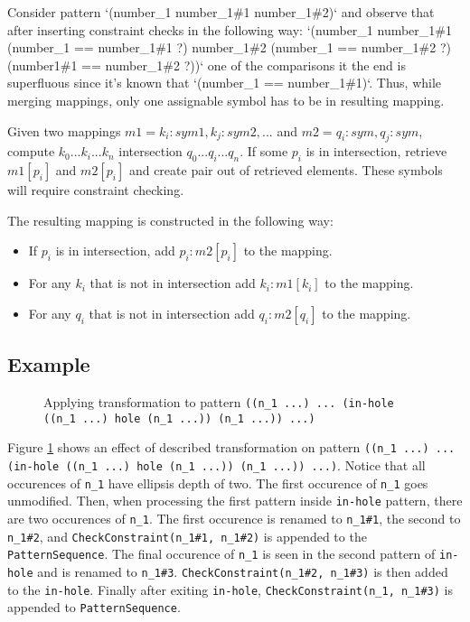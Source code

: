 Consider pattern `(number\_1 number\_1\#1 number\_1\#2)` and observe that after inserting constraint checks in the following way: `(number\_1 number\_1\#1 (number\_1 == number\_1\#1 ?) number\_1\#2 (number\_1 == number\_1\#2 ?) (number1\#1 == number\_1\#2 ?))` one of the comparisons it the end is superfluous since it's known that `(number\_1 == number\_1\#1)`. Thus, while merging mappings, only one assignable symbol has to be in resulting mapping.

Given two mappings $m1 = {k_i: sym1, k_j: sym2, ...}$ and $m2 = {q_i: sym, q_j: sym}$, compute ${k_0 ... k_i ... k_n}$ intersection ${q_0 ... q_i ... q_n}$. If some $p_i$ is in intersection, retrieve $m1[p_i]$ and $m2[p_i]$ and create pair out of retrieved elements. These symbols will require constraint checking. 

The resulting mapping is constructed in the following way:
\begin{itemize}
\item
If $p_i$ is in intersection, add ${p_i: m2[p_i]}$ to the mapping.
\item
For any $k_i$ that is not in intersection add ${k_i: m1[k_i]}$ to the mapping.
\item
For any $q_i$ that is not in intersection add ${q_i: m2[q_i]}$ to the mapping.
\end{itemize}

\subsection{Example}

\begin{figure}[H]
	\centering
\caption{Applying transformation to pattern \texttt{((n\_1 ...) ... (in-hole ((n\_1 ...) hole (n\_1 ...)) (n\_1 ...)) ...)}}
\label{transformation-pattern-constraintcheck}
\end{figure}

Figure \ref{transformation-pattern-constraintcheck} shows an effect of described transformation on pattern \texttt{((n\_1 ...) ... (in-hole ((n\_1 ...) hole (n\_1 ...)) (n\_1 ...)) ...)}. Notice that all occurences of \texttt{n\_1} have ellipsis depth of two. The first occurence of \texttt{n\_1} goes unmodified. Then, when processing the first pattern inside \texttt{in-hole} pattern, there are two occurences of \texttt{n\_1}. The first occurence is renamed to \texttt{n\_1\#1}, the second to \texttt{n\_1\#2}, and \texttt{CheckConstraint(n\_1\#1, n\_1\#2)} is appended to the \texttt{PatternSequence}. The final occurence of \texttt{n\_1} is seen in the second pattern of \texttt{in-hole} and is renamed to \texttt{n\_1\#3}. \texttt{CheckConstraint(n\_1\#2, n\_1\#3)} is then added to the \texttt{in-hole}. Finally after exiting \texttt{in-hole}, \texttt{CheckConstraint(n\_1, n\_1\#3)} is appended to \texttt{PatternSequence}.


